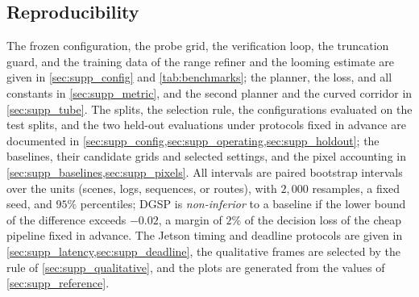 \documentclass[10pt,letterpaper]{article}
\newcommand{\method}{DGSP\xspace}
\theoremstyle{remark}
\theoremstyle{plain}
\theoremstyle{definition}
\begin{document}
\subsection{Reproducibility}
\label{sec:supp_repro}

The frozen configuration, the probe grid, the verification loop, the truncation guard, and the training data of the range refiner and the looming estimate are given in \cref{sec:supp_config} and \cref{tab:benchmarks}; the planner, the loss, and all constants in \cref{sec:supp_metric}, and the second planner and the curved corridor in \cref{sec:supp_tube}.
The splits, the selection rule, the configurations evaluated on the test splits, and the two held-out evaluations under protocols fixed in advance are documented in \cref{sec:supp_config,sec:supp_operating,sec:supp_holdout}; the baselines, their candidate grids and selected settings, and the pixel accounting in \cref{sec:supp_baselines,sec:supp_pixels}.
All intervals are paired bootstrap intervals over the units (scenes, logs, sequences, or routes), with $2{,}000$ resamples, a fixed seed, and $95\%$ percentiles; \method is \emph{non-inferior} to a baseline if the lower bound of the difference exceeds $-0.02$, a margin of $2\%$ of the decision loss of the cheap pipeline fixed in advance.
The Jetson timing and deadline protocols are given in \cref{sec:supp_latency,sec:supp_deadline}, the qualitative frames are selected by the rule of \cref{sec:supp_qualitative}, and the plots are generated from the values of \cref{sec:supp_reference}.
\end{document}
